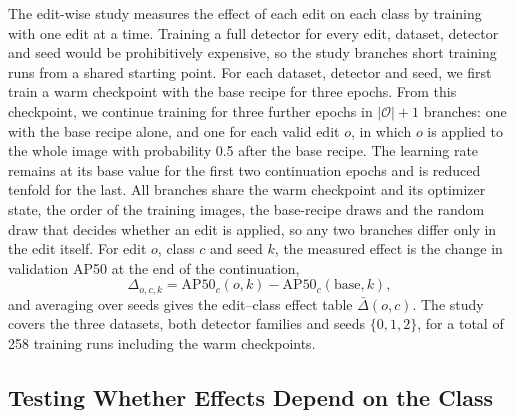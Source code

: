 \documentclass[conference]{IEEEtran}
\begin{document}
The edit-wise study measures the effect of each edit on each class by training with one edit at a time. Training a full detector for every edit, dataset, detector and seed would be prohibitively expensive, so the study branches short training runs from a shared starting point. For each dataset, detector and seed, we first train a warm checkpoint with the base recipe for three epochs. From this checkpoint, we continue training for three further epochs in $|\mathcal{O}|+1$ branches: one with the base recipe alone, and one for each valid edit $o$, in which $o$ is applied to the whole image with probability 0.5 after the base recipe. The learning rate remains at its base value for the first two continuation epochs and is reduced tenfold for the last. All branches share the warm checkpoint and its optimizer state, the order of the training images, the base-recipe draws and the random draw that decides whether an edit is applied, so any two branches differ only in the edit itself. For edit $o$, class $c$ and seed $k$, the measured effect is the change in validation AP50 at the end of the continuation,
\begin{equation}
\Delta_{o,c,k}=\mathrm{AP50}_c(o,k)-\mathrm{AP50}_c(\mathrm{base},k),
\label{eq:delta}
\end{equation}
and averaging over seeds gives the edit--class effect table $\bar\Delta(o,c)$. The study covers the three datasets, both detector families and seeds $\{0,1,2\}$, for a total of 258 training runs including the warm checkpoints.

\subsection{Testing Whether Effects Depend on the Class}
\label{sec:measure_tests}
\end{document}
